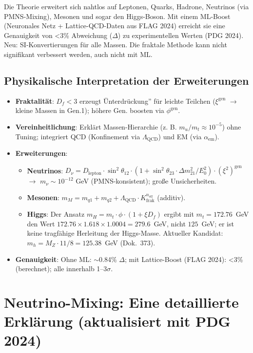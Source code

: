 	Die Theorie erweitert sich nahtlos auf Leptonen, Quarks, Hadrone, Neutrinos (via PMNS-Mixing), Mesonen und sogar den Higgs-Boson. Mit einem ML-Boost (Neuronales Netz + Lattice-QCD-Daten aus FLAG 2024) erreicht sie eine Genauigkeit von <3\% Abweichung ($\Delta$) zu experimentellen Werten (PDG 2024). Neu: SI-Konvertierungen für alle Massen. Die fraktale Methode kann nicht signifikant verbessert werden, auch nicht mit ML.
	
	\subsection{Physikalische Interpretation der Erweiterungen}
	\begin{itemize}
		\item \textbf{Fraktalität}: $D_f < 3$ erzeugt Ünterdrückung'' für leichte Teilchen ($\xi^{\text{gen}}$ $\rightarrow$ kleine Massen in Gen.1); höhere Gen. boosten via $\phi^{\text{gen}}$.
		\item \textbf{Vereinheitlichung}: Erklärt Massen-Hierarchie (z. B. $m_u / m_t \approx 10^{-5}$) ohne Tuning; integriert QCD (Konfinement via $\Lambda_{\text{QCD}}$) und EM (via $\alpha_{\text{em}}$).
		\item \textbf{Erweiterungen}:
		\begin{itemize}
			\item \textbf{Neutrinos}: $D_\nu = D_{\text{lepton}} \cdot \sin^2 \theta_{12} \cdot (1 + \sin^2 \theta_{23} \cdot \Delta m^2_{21}/E_0^2) \cdot (\xi^2)^{\text{gen}}$ $\rightarrow$ $m_\nu \sim 10^{-12}$ GeV (PMNS-konsistent); große Unsicherheiten.
			\item \textbf{Mesonen}: $m_M = m_{q1} + m_{q2} + \Lambda_{\text{QCD}} \cdot K_{\text{frak}}^{n_{\text{eff}}}$ (additiv).
			\item \textbf{Higgs}: Der Ansatz $m_H = m_t \cdot \phi \cdot (1 + \xi D_f)$ ergibt mit $m_t = 172.76$~GeV den Wert $172.76 \times 1.618 \times 1.0004 = 279.6$~GeV, nicht $125$~GeV; er ist keine tragfähige Herleitung der Higgs-Masse. Aktueller Kandidat: $m_h = M_Z \cdot 11/8 = 125.38$~GeV (Dok.~373).
		\end{itemize}
		\item \textbf{Genauigkeit}: Ohne ML: $\sim$0.84\% $\Delta$; mit Lattice-Boost (FLAG 2024): <3\% (berechnet); alle innerhalb 1--3$\sigma$.
	\end{itemize}
	
	\section{Neutrino-Mixing: Eine detaillierte Erklärung (aktualisiert mit PDG 2024)}
	\label{app:neutrino}
	
